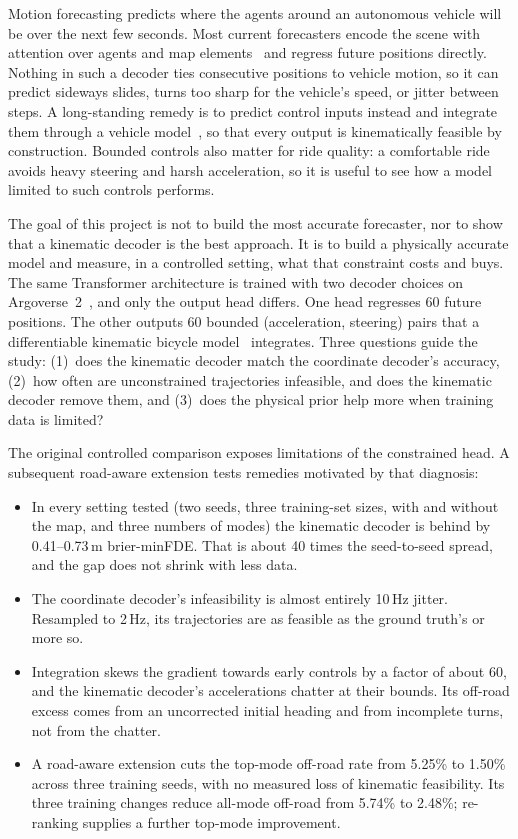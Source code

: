 \documentclass[conference]{IEEEtran}
\begin{document}
Motion forecasting predicts where the agents around an autonomous vehicle will be over the next few
seconds. Most current forecasters encode the scene with attention over agents and map
elements~\cite{gao2020vectornet,ngiam2022scenetransformer,nayakanti2023wayformer,shi2022mtr,zhou2023qcnet}
and regress future positions directly. Nothing in such a decoder ties consecutive positions to
vehicle motion, so it can predict sideways slides, turns too sharp for the vehicle's speed, or
jitter between steps. A long-standing remedy is to predict control inputs instead and integrate
them through a vehicle model~\cite{cui2020dkm,salzmann2020trajectronpp}, so that every output is
kinematically feasible by construction. Bounded controls also matter for ride quality: a comfortable
ride avoids heavy steering and harsh acceleration, so it is useful to see how a model limited to
such controls performs.

The goal of this project is not to build the most accurate forecaster, nor to show that a kinematic
decoder is the best approach. It is to build a physically accurate model and measure, in a
controlled setting, what that constraint costs and buys. The same Transformer
architecture is trained with two decoder choices on Argoverse~2~\cite{wilson2021argoverse2}, and only the output head
differs. One head regresses 60 future positions. The other outputs 60 bounded
(acceleration, steering) pairs that a differentiable kinematic bicycle
model~\cite{kong2015kinematic,polack2017kinematic} integrates. Three questions guide the study:
(1)~does the kinematic decoder match the coordinate decoder's accuracy, (2)~how often are
unconstrained trajectories infeasible, and does the kinematic decoder remove them, and (3)~does the
physical prior help more when training data is limited?

The original controlled comparison exposes limitations of the constrained head. A subsequent
road-aware extension tests remedies motivated by that diagnosis:
\begin{itemize}
\item In every setting tested (two seeds, three training-set sizes, with and without the map, and
  three numbers of modes) the kinematic decoder is behind by 0.41--0.73\,m brier-minFDE. That is
  about 40 times the seed-to-seed spread, and the gap does not shrink with less data.
\item The coordinate decoder's infeasibility is almost entirely 10\,Hz jitter. Resampled to 2\,Hz,
  its trajectories are as feasible as the ground truth's or more so.
\item Integration skews the gradient towards early controls by a factor of about 60, and the
  kinematic decoder's accelerations chatter at their bounds. Its off-road excess comes from an
  uncorrected initial heading and from incomplete turns, not from the chatter.
\item A road-aware extension cuts the top-mode off-road rate from 5.25\% to 1.50\% across three
  training seeds, with no measured loss of kinematic feasibility. Its three training changes
  reduce all-mode off-road from 5.74\% to 2.48\%; re-ranking supplies a further top-mode improvement.
\end{itemize}
\end{document}
